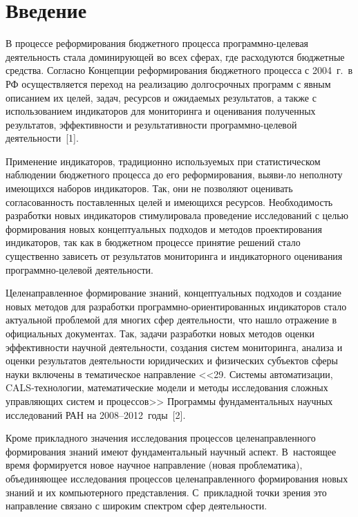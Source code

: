       \begin{multicols}{2}
      
            \label{st\stat}


\section{Введение}

   В процессе реформирования бюджетного процесса программно-целевая деятельность 
стала доминирующей во всех сферах, где расходуются бюджет\-ные средства. Согласно 
Концепции реформирования бюджетного процесса с 2004~г.\ в РФ осуществляется переход 
на реализацию долгосрочных программ с явным описанием их целей, задач, ресурсов и 
ожидаемых результатов, а также с использованием индикаторов для мониторинга и 
оценивания полученных результатов, эффективности и результативности программно-це\-ле\-вой 
деятель\-ности~[1].
   
   Применение индикаторов, традиционно используемых при статистическом наблюдении 
бюджетного процесса до его реформирования, выяви-\linebreak ло неполноту имеющихся наборов 
индикаторов. Так,
 они не позволяют оценивать согласованность поставленных целей и 
имеющихся ресурсов. Не\-об\-ходимость разработки новых индикаторов стимулировала 
проведение исследований с целью формирования новых концептуальных подходов и 
методов проектирования индикаторов, так как в бюджетном процессе принятие решений 
стало существенно зависеть от результатов мониторинга и индикаторного оценивания 
программно-целевой деятельности.
   
   Целенаправленное формирование знаний, концептуальных подходов и создание новых 
методов для разработки программно-ориентированных индикаторов стало актуальной 
проблемой для многих сфер деятельности, что нашло отражение в официальных документах. 
Так, задачи разработки новых методов оценки эффективности научной деятельности, 
создания систем мониторинга, анализа и оценки результатов деятельности юридических и 
физических субъектов сферы науки включены в тематическое направление <<29. Системы 
автоматизации, CALS-технологии, математические модели и методы исследования сложных 
управляющих сис\-тем и процессов>> Программы фундаментальных научных исследований 
РАН на 2008--2012~годы~[2].
   
   Кроме прикладного значения исследования процессов целенаправленного формирования 
знаний имеют фундаментальный научный аспект. В~настоящее время формируется новое 
научное направление (новая проблематика), объеди\-ня\-ющее исследования процессов 
целенаправленного формирования новых знаний и их компьютерного представления. 
С~прикладной точки зрения это направление связано с широким спектром сфер 
деятельности.
   

\end{multicols}
